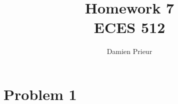 \documentclass{article}
\author{Damien Prieur}
\title{Homework 7\\ ECES 512}
\date{}
\begin{document}
\maketitle

\section*{Problem 1}
\end{document}
